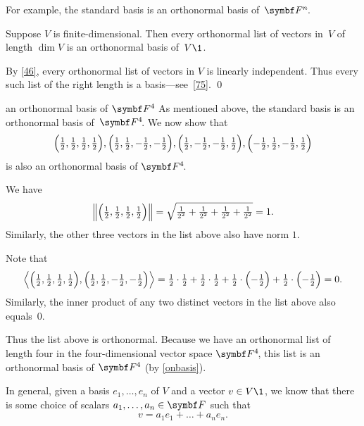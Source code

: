 
For example, the standard basis is an orthonormal basis of~$\FF{n}$.

{Suppose $V$ is finite-dimensional. Then every orthonormal list of vectors in~$V$ of length $\dim V$ is an orthonormal basis of~$V\1$.}

\proof
By \ref{46}, every orthonormal list of vectors in $V$ is linearly independent. Thus every such list of the right length is a basis---see~\ref{75}.
\qed

\begin{example}[4FonBasis]{an orthonormal basis of\/ $\F{4}$}
As mentioned above,  the standard basis is an orthonormal basis of~$\FF{4}$. We now show that
\[
\paren[\Big]{\tfrac{1}{2}, \tfrac{1}{2}, \tfrac{1}{2}, \tfrac{1}{2}},
\paren[\Big]{\tfrac{1}{2}, \tfrac{1}{2}, -\tfrac{1}{2}, -\tfrac{1}{2}},
\paren[\Big]{\tfrac{1}{2}, -\tfrac{1}{2}, -\tfrac{1}{2}, \tfrac{1}{2}},
\paren[\Big]{-\tfrac{1}{2}, \tfrac{1}{2}, -\tfrac{1}{2}, \tfrac{1}{2}}
\]
is also an orthonormal basis of $\FF{4}$.

We have
\[
\norm[\Big]{ \paren[\Big]{\tfrac{1}{2}, \tfrac{1}{2}, \tfrac{1}{2}, \tfrac{1}{2}} }
= \sqrt{ \tfrac{1}{2^2} + \tfrac{1}{2^2} + \tfrac{1}{2^2}+ \tfrac{1}{2^2} }  = 1.
\]
Similarly, the other three vectors in the list above also have norm $1$.

Note that
\[
\ip[\Big]{ \paren[\Big]{\tfrac{1}{2}, \tfrac{1}{2}, \tfrac{1}{2}, \tfrac{1}{2}},
\paren[\Big]{ \tfrac{1}{2}, \tfrac{1}{2}, -\tfrac{1}{2}, -\tfrac{1}{2}} } =
\tfrac{1}{2} \cdot \tfrac{1}{2} + \tfrac{1}{2} \cdot \tfrac{1}{2}
+ \tfrac{1}{2} \cdot \paren[\Big]{-\tfrac{1}{2}} + \tfrac{1}{2} \cdot \paren[\Big]{ -\tfrac{1}{2} } = 0.
\]
Similarly, the inner product of any two distinct vectors in the list above also equals~$0$.

Thus the list above is orthonormal. Because we have an orthonormal list of length four in the four-dimensional vector space $\FF{4}$, this list is an orthonormal basis of $\F{4}$ (by \ref{onbasis}).
\end{example}

In general, given a basis $e_1, \dots, e_n$ of $V$ and a vector $v \in V\1$, we
know that there is some choice of scalars $a_1, \dots, a_n \in \F{}$ such that
\[
v = a_1 e_1 + \dots + a_n e_n.
\]

